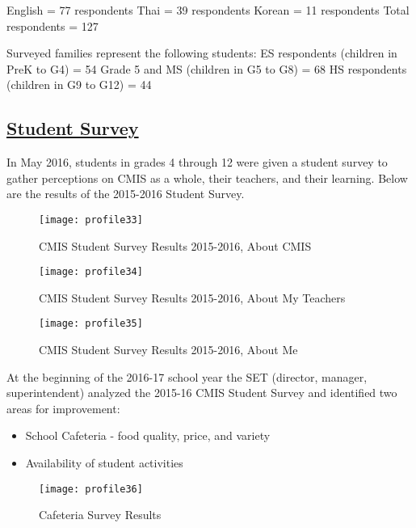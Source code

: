 \begin{table}[h]
English = 77 respondents
Thai = 39 respondents
Korean = 11 respondents
Total respondents = 127

Surveyed families represent the following students: 
ES respondents (children in PreK to G4) = 54
Grade 5 and MS (children in G5 to G8) = 68
HS respondents (children in G9 to G12) = 44
\end{table}


\subsection{\href{https://docs.google.com/a/cmis.ac.th/forms/d/1n7vFCQbPQmF6pEPJKPBsu4rzdiW4KQ_DrBcjTMUbLH4/viewanalytics}{Student Survey}}

In May 2016, students in grades 4 through 12 were given a student survey to gather perceptions on CMIS as a whole, their teachers, and their learning.  Below are the results of the 2015-2016 Student Survey.  

\begin{figure}
\centering
\texttt{[image: profile33]}
\caption{CMIS Student Survey Results 2015-2016, About CMIS}
\end{figure}

\begin{figure}
\centering
\texttt{[image: profile34]}
\caption{CMIS Student Survey Results 2015-2016, About My Teachers}
\end{figure}

\begin{figure}
\centering
\texttt{[image: profile35]}
\caption{CMIS Student Survey Results 2015-2016, About Me}
\end{figure}

At the beginning of the 2016-17 school year the SET (director, manager, superintendent) analyzed the 2015-16 CMIS Student Survey and identified two areas for improvement:
\begin{itemize}
\item School Cafeteria - food quality, price, and variety
\item Availability of student activities
\end{itemize}

\begin{figure}
\centering
\texttt{[image: profile36]}
\caption{Cafeteria Survey Results}
\end{figure}


